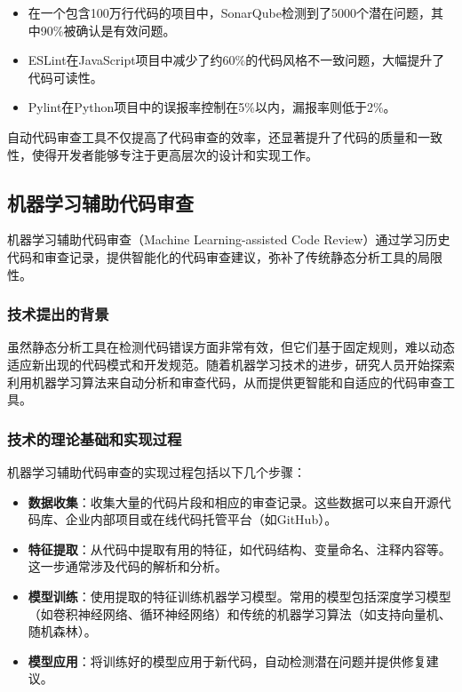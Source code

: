 \documentclass{article}
\begin{document}
\begin{itemize}
    \item 在一个包含100万行代码的项目中，SonarQube检测到了5000个潜在问题，其中90\%被确认是有效问题。
    \item ESLint在JavaScript项目中减少了约60\%的代码风格不一致问题，大幅提升了代码可读性。
    \item Pylint在Python项目中的误报率控制在5\%以内，漏报率则低于2\%。
\end{itemize}

自动代码审查工具不仅提高了代码审查的效率，还显著提升了代码的质量和一致性，使得开发者能够专注于更高层次的设计和实现工作。

\subsection{机器学习辅助代码审查}

机器学习辅助代码审查（Machine Learning-assisted Code Review）通过学习历史代码和审查记录，提供智能化的代码审查建议，弥补了传统静态分析工具的局限性。

\subsubsection{技术提出的背景}

虽然静态分析工具在检测代码错误方面非常有效，但它们基于固定规则，难以动态适应新出现的代码模式和开发规范。随着机器学习技术的进步，研究人员开始探索利用机器学习算法来自动分析和审查代码，从而提供更智能和自适应的代码审查工具。

\subsubsection{技术的理论基础和实现过程}

机器学习辅助代码审查的实现过程包括以下几个步骤：

\begin{itemize}
    \item \textbf{数据收集}：收集大量的代码片段和相应的审查记录。这些数据可以来自开源代码库、企业内部项目或在线代码托管平台（如GitHub）。
    \item \textbf{特征提取}：从代码中提取有用的特征，如代码结构、变量命名、注释内容等。这一步通常涉及代码的解析和分析。
    \item \textbf{模型训练}：使用提取的特征训练机器学习模型。常用的模型包括深度学习模型（如卷积神经网络、循环神经网络）和传统的机器学习算法（如支持向量机、随机森林）。
    \item \textbf{模型应用}：将训练好的模型应用于新代码，自动检测潜在问题并提供修复建议。
\end{itemize}
\end{document}
